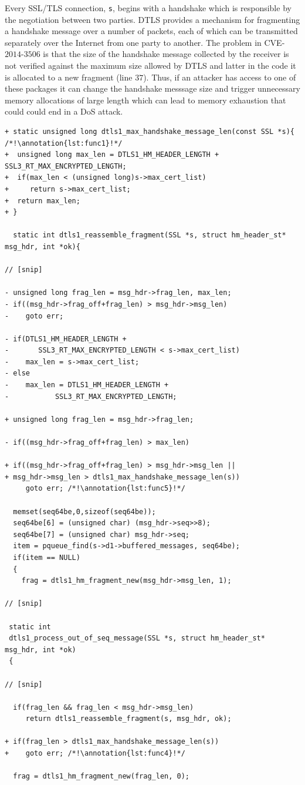 \documentclass[10pt,conference]{IEEEtran}
\newcounter{lstannotation}
\renewcommand{\thelstannotation}{\ding{\number\numexpr181+\arabic{lstannotation}}}
\newcommand{\annotation}[1]{\refstepcounter{lstannotation}\label{#1}\thelstannotation}
\begin{document}
Every SSL/TLS connection, \texttt{s}, begins with a handshake which is responsible by the
negotiation between two parties. DTLS provides a mechanism for fragmenting a
handshake message over a number of packets, each of which can be transmitted
separately over the Internet from one party to another. The problem in CVE-$2014$-$3506$ 
is that the size of the handshake message collected by the receiver is not verified against 
the maximum size allowed by DTLS and latter in the code it is allocated to a new fragment (line $37$). 
Thus, if an attacker has access to one of these packages it can change the handshake messsage size and
trigger unnecessary memory allocations of large length which can lead to memory exhaustion that could
could end in a DoS attack.


\medskip

\setcounter{lstannotation}{0}
\begin{lstlisting}[style={CStyle}, caption={Fix provided by OpenSSL developers to the
\\CVE-$2014$-$3506$ vulnerability},label={lst:vuln}]
+ static unsigned long dtls1_max_handshake_message_len(const SSL *s){ /*!\annotation{lst:func1}!*/
+  unsigned long max_len = DTLS1_HM_HEADER_LENGTH + SSL3_RT_MAX_ENCRYPTED_LENGTH;
+  if(max_len < (unsigned long)s->max_cert_list)
+     return s->max_cert_list;
+  return max_len;
+ }

  static int dtls1_reassemble_fragment(SSL *s, struct hm_header_st* msg_hdr, int *ok){

// [snip]

- unsigned long frag_len = msg_hdr->frag_len, max_len;
- if((msg_hdr->frag_off+frag_len) > msg_hdr->msg_len)
-    goto err;

- if(DTLS1_HM_HEADER_LENGTH +
-    	SSL3_RT_MAX_ENCRYPTED_LENGTH < s->max_cert_list)
-    max_len = s->max_cert_list;
- else
-    max_len = DTLS1_HM_HEADER_LENGTH +
-   		SSL3_RT_MAX_ENCRYPTED_LENGTH;

+ unsigned long frag_len = msg_hdr->frag_len;

- if((msg_hdr->frag_off+frag_len) > max_len)

+ if((msg_hdr->frag_off+frag_len) > msg_hdr->msg_len ||
+ msg_hdr->msg_len > dtls1_max_handshake_message_len(s))
     goto err; /*!\annotation{lst:func5}!*/

  memset(seq64be,0,sizeof(seq64be));
  seq64be[6] = (unsigned char) (msg_hdr->seq>>8);
  seq64be[7] = (unsigned char) msg_hdr->seq;
  item = pqueue_find(s->d1->buffered_messages, seq64be);
  if(item == NULL)
  {
    frag = dtls1_hm_fragment_new(msg_hdr->msg_len, 1);

// [snip]

 static int
 dtls1_process_out_of_seq_message(SSL *s, struct hm_header_st* msg_hdr, int *ok)
 {

// [snip]

  if(frag_len && frag_len < msg_hdr->msg_len)
     return dtls1_reassemble_fragment(s, msg_hdr, ok);

+ if(frag_len > dtls1_max_handshake_message_len(s))
+    goto err; /*!\annotation{lst:func4}!*/

  frag = dtls1_hm_fragment_new(frag_len, 0);

\end{lstlisting}
\end{document}
